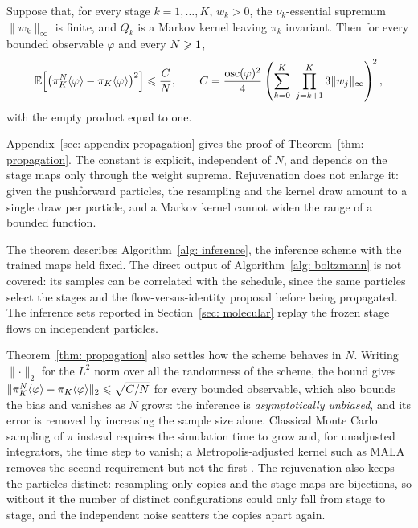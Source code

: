 \documentclass{article}
\begin{document}
\begin{theorem}
\label{thm: propagation}
Suppose that, for every stage $k=1,\dots,K$, $w_k>0$, the $\nu_k$-essential supremum $\lVert w_k \rVert_\infty$ is finite, and $Q_k$ is a Markov kernel leaving $\pi_k$ invariant. Then for every bounded observable $\varphi$ and every $N \geqslant 1$,
\begin{equation}
    \mathbb E\Bigl[\bigl(\pi_K^N\langle \varphi\rangle - \pi_K\langle \varphi\rangle\bigr)^{2}\Bigr]
    \leqslant \frac{C}{N},
    \qquad
    C = \frac{\operatorname{osc}(\varphi)^{2}}{4}
    \left(\sum_{k=0}^{K}\ \prod_{j=k+1}^{K} 3\lVert w_j \rVert_\infty\right)^{\!2},
    \label{eq: propagation-bound}
\end{equation}
with the empty product equal to one.
\end{theorem}
\noindent
Appendix~\ref{sec: appendix-propagation} gives the proof of Theorem~\ref{thm: propagation}. The constant is explicit, independent of $N$, and depends on the stage maps only through the weight suprema. Rejuvenation does not enlarge it: given the pushforward particles, the resampling and the kernel draw amount to a single draw per particle, and a Markov kernel cannot widen the range of a bounded function.

\begin{remark}
{\color{purple}The theorem describes Algorithm~\ref{alg: inference}, the inference scheme with the trained maps held fixed. The direct output of Algorithm~\ref{alg: boltzmann} is not covered: its samples can be correlated with the schedule, since the same particles select the stages and the flow-versus-identity proposal before being propagated. The inference sets reported in Section~\ref{sec: molecular} replay the frozen stage flows on independent particles.}
\end{remark}

Theorem~\ref{thm: propagation} also settles how the scheme behaves in $N$. Writing $\lVert\cdot\rVert_2$ for the $L^2$ norm over all the randomness of the scheme, the bound gives $\lVert \pi_K^N\langle \varphi\rangle - \pi_K\langle \varphi\rangle \rVert_2 \leqslant \sqrt{C/N}$ for every bounded observable, which also bounds the bias and vanishes as $N$ grows: the inference is \emph{asymptotically unbiased}, and its error is removed by increasing the sample size alone. Classical Monte Carlo sampling of $\pi$ instead requires the simulation time to grow and, for unadjusted integrators, the time step to vanish; a Metropolis-adjusted kernel such as MALA removes the second requirement but not the first \citep{metropolis1953equation,hastings1970monte,roberts1996exponential,delmoral2004feynman}. The rejuvenation also keeps the particles distinct: resampling only copies and the stage maps are bijections, so without it the number of distinct configurations could only fall from stage to stage, and the independent noise scatters the copies apart again.
\end{document}
